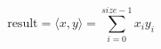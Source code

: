 \documentclass{article}
\begin{document}
\[\mathrm{result} = \langle x,y \rangle = \sum\limits_{i = 0}^{size-1} x_i y_i\]
\pagebreak
\end{document}
